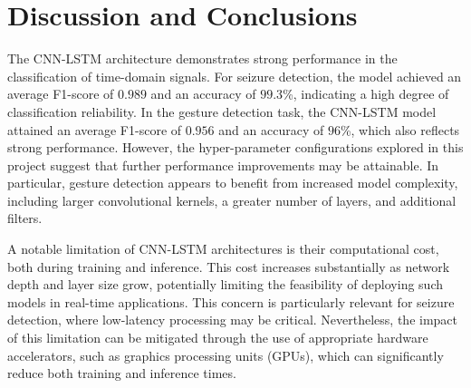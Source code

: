 
\section{Discussion and Conclusions}
The CNN-LSTM architecture demonstrates strong performance in the classification of time-domain signals. For seizure detection, the model achieved an average F1-score of $0.989$ and an accuracy of $99.3$\%, indicating a high degree of classification reliability. In the gesture detection task, the CNN-LSTM model attained an average F1-score of $0.956$ and an accuracy of $96$\%, which also reflects strong performance. However, the hyper-parameter configurations explored in this project suggest that further performance improvements may be attainable. In particular, gesture detection appears to benefit from increased model complexity, including larger convolutional kernels, a greater number of layers, and additional filters.

A notable limitation of CNN-LSTM architectures is their computational cost, both during training and inference. This cost increases substantially as network depth and layer size grow, potentially limiting the feasibility of deploying such models in real-time applications. This concern is particularly relevant for seizure detection, where low-latency processing may be critical. Nevertheless, the impact of this limitation can be mitigated through the use of appropriate hardware accelerators, such as graphics processing units (GPUs), which can significantly reduce both training and inference times.


